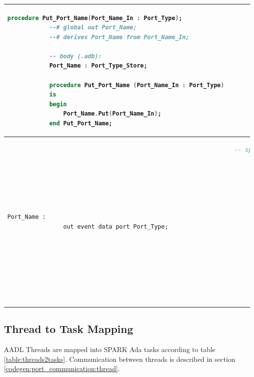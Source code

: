 \begin{center}
\begin{longtable}{| p{2in} | p{4in} |}
\begin{lstlisting}[language=ada]
			procedure Put_Port_Name(Port_Name_In : Port_Type);
			--# global out Port_Name;
			--# derives Port_Name from Port_Name_In;

			-- body (.adb):
			Port_Name : Port_Type_Store;

			procedure Put_Port_Name (Port_Name_In : Port_Type) 
			is
			begin
				Port_Name.Put(Port_Name_In);
			end Put_Port_Name;
		\end{lstlisting} 

		\\ \hline

		\begin{lstlisting}[language=aadl]
			Port_Name : 
				out event data port Port_Type;
		\end{lstlisting} 
		&
		\begin{lstlisting}[language=ada]
			-- spec (.ads)
			--# own protected Port_Name : Port_Type_Store(Priority => 10);
			
			procedure Send_Port_Name;
    		--# global in Port_Name;

			-- body (.adb):
			Port_Name : Port_Type_Store;

			procedure Send_Port_Name 
			is
			begin
				-- TODO: implement receiving Port_Name value
				-- e.g.:
				-- Some_Pkg.Put_Port_Name(Port_Name);
			end Send_Port_Name;
		\end{lstlisting} 
	\end{longtable}
\end{center}
\doublespacing


\subsection{Thread to Task Mapping}
\label{codegen:mapping:threads}

AADL Threads are mapped into SPARK Ada tasks according to table \ref{table:threads2tasks}. Communication between threads is described in section \ref{codegen:port_communication:thread}.

